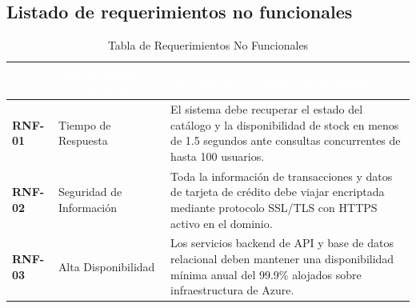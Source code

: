 \subsection{Listado de requerimientos no funcionales}
\begin{table}[H]
    \centering
    \small
    \renewcommand{\arraystretch}{1.4}
    \begin{tabularx}{\textwidth}{|l|p{4.5cm}|L|}
        \hline
         \textcolor{white}{\textbf{ID}} & \textcolor{white}{\textbf{Requerimiento No Funcional}} & \textcolor{white}{\textbf{Descripción / Criterio de Medición}} \\
        \hline
        \textbf{RNF-01} & Tiempo de Respuesta & El sistema debe recuperar el estado del catálogo y la disponibilidad de stock en menos de 1.5 segundos ante consultas concurrentes de hasta 100 usuarios. \\
        \hline
        \textbf{RNF-02} & Seguridad de Información & Toda la información de transacciones y datos de tarjeta de crédito debe viajar encriptada mediante protocolo SSL/TLS con HTTPS activo en el dominio. \\
        \hline
        \textbf{RNF-03} & Alta Disponibilidad & Los servicios backend de API y base de datos relacional deben mantener una disponibilidad mínima anual del 99.9\% alojados sobre infraestructura de Azure. \\
        \hline
    \end{tabularx}
    \caption{Tabla de Requerimientos No Funcionales}
    \label{tab:requerimientos_no_funcionales}
\end{table}